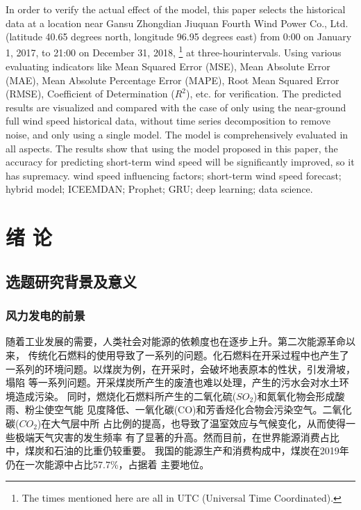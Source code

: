 \documentclass[AutoFakeBold]{LZUThesis}
\begin{document}
{{In order to verify the actual effect of the model, this paper selects the
historical data at a location near Gansu Zhongdian Jiuquan Fourth Wind Power
Co., Ltd. (latitude 40.65 degrees north, longitude 96.95 degrees east) from
0:00 on January 1, 2017, to 21:00 on December 31, 2018, 
\footnote{The times mentioned here are all in UTC (Universal Time Coordinated). }
at three-hourintervals. Using various evaluating indicators like Mean Squared
Error (MSE), Mean Absolute Error (MAE), Mean Absolute Percentage Error (MAPE),
Root Mean Squared Error (RMSE), Coefficient of Determination ($R^2$), etc.
for verification. The predicted results are visualized and compared with the
case of only using the near-ground full wind speed historical data, without
time series decomposition to remove noise, and only using a single model.
The model is comprehensively evaluated in all aspects. The results show
that using the model proposed in this paper, the accuracy for predicting
short-term wind speed will be significantly improved, so it has supremacy.
}}
{wind speed influencing factors; short-term wind speed forecast; 
hybrid model; ICEEMDAN; Prophet; GRU; deep learning; data science.
}

\tableofcontents


\mainmatter

\chapter{绪 \qquad 论}


\section{选题研究背景及意义}
\subsection{风力发电的前景}
随着工业发展的需要，人类社会对能源的依赖度也在逐步上升。第二次能源革命以来，
传统化石燃料的使用导致了一系列的问题。化石燃料在开采过程中也产生了
一系列的环境问题。以煤炭为例，在开采时，会破坏地表原本的性状，引发滑坡，塌陷
等一系列问题。开采煤炭所产生的废渣也难以处理，产生的污水会对水土环境造成污染。
同时，燃烧化石燃料所产生的二氧化硫($SO_2$)和氮氧化物会形成酸雨、粉尘使空气能
见度降低、一氧化碳(CO)和芳香烃化合物会污染空气。二氧化碳($CO_2$)在大气层中所
占比例的提高，也导致了温室效应与气候变化，从而使得一些极端天气灾害的发生频率
有了显著的升高。然而目前，在世界能源消费占比中，煤炭和石油的比重仍较重要。
我国的能源生产和消费构成中，煤炭在2019年仍在一次能源中占比57.7\%，占据着
主要地位。\cite{能源数据2021王庆一}
\end{document}
